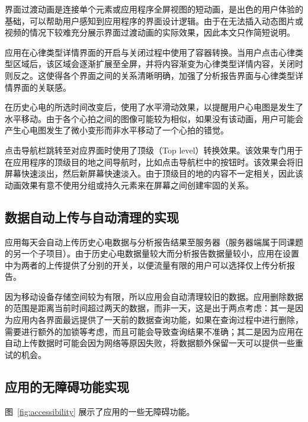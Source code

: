 界面过渡动画是连接单个元素或应用程序全屏视图的短动画，是出色的用户体验的基础，可以帮助用户感知到应用程序的界面设计逻辑。由于在无法插入动态图片或视频的情况下较难充分展示界面过渡动画的实际效果，因此本文只作简短说明。

应用在心律类型详情界面的开启与关闭过程中使用了容器转换。当用户点击心律类型区域后，该区域会逐渐扩展至全屏，并将内容渐变为心律类型详情内容，关闭时则反之。这使得各个界面之间的关系清晰明确，加强了分析报告界面与心律类型详情界面的关联感。

在历史心电的所选时间改变后，使用了水平滑动效果，以提醒用户心电图是发生了水平移动。由于各个心拍之间的图像可能较为相似，如果没有该动画，用户可能会产生心电图发生了微小变形而非水平移动了一个心拍的错觉。

点击导航栏跳转至对应界面时使用了顶级（Top level）转换效果。该效果专门用于在应用程序的顶级目的地之间导航时，比如点击导航栏中的按钮时。该效果会将旧屏幕快速淡出，然后新屏幕快速淡入。由于顶级目的地的内容不一定相关，因此该动画效果有意不使用分组或持久元素来在屏幕之间创建牢固的关系。


\subsection{数据自动上传与自动清理的实现}\label{subsec:data-auto-ui}

应用每天会自动上传历史心电数据与分析报告结果至服务器（服务器端属于同课题的另一个子项目）。由于历史心电数据量较大而分析报告数据量较小，应用在设置中为两者的上传提供了分别的开关，以便流量有限的用户可以选择仅上传分析报告。

因为移动设备存储空间较为有限，所以应用会自动清理较旧的数据。应用删除数据的范围是距离当前时间超过两天的数据，而非一天，这是出于两点考虑：其一是因为应用内各界面最远提供了一天前的数据查询功能，如果在查询过程中进行删除，需要进行额外的加锁等考虑，而且可能会导致查询结果不准确；其二是因为应用在自动上传数据时可能会因为网络等原因失败，将数据额外保留一天可以提供一些重试的机会。


\subsection{应用的无障碍功能实现}\label{subsec:accessibility-ui}

图~\ref{fig:accessibility} 展示了应用的一些无障碍功能。

